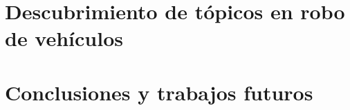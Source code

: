 \documentclass[
	spanish, %
	aspectratio=43, %
	hyperref={pdfencoding=auto,psdextra},
	xcolor={dvipsnames,table,usenames}
]{beamer}
\begin{document}
\section{Descubrimiento de tópicos en robo de vehículos}

\begin{frame}
\frametitle{}
\end{frame}


\begin{frame}
\frametitle{}
\end{frame}


\begin{frame}
\frametitle{}
\end{frame}


\begin{frame}
\frametitle{}
\end{frame}

\begin{frame}
\frametitle{}
\end{frame}

\begin{frame}
\frametitle{}
\end{frame}

\section{Conclusiones y trabajos futuros}

\begin{frame}
\frametitle{}
\end{frame}

\begin{frame}
\frametitle{}
\end{frame}

\begin{frame}[allowframebreaks]\normalsize
	\frametitle{\namereferences}
	
\end{frame}
\end{document}
